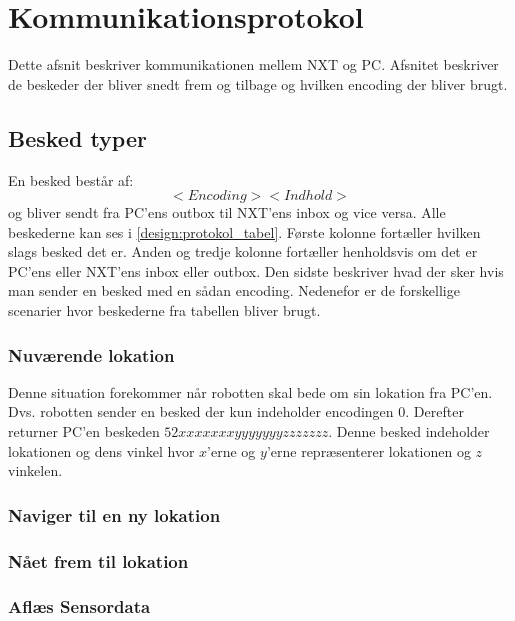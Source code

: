 \section{Kommunikationsprotokol}
Dette afsnit beskriver kommunikationen mellem NXT og PC.
Afsnitet beskriver de beskeder der bliver snedt frem og tilbage og hvilken encoding der bliver brugt.

\subsection{Besked typer}
En besked består af:
\begin{equation}
<Encoding><Indhold>
\end{equation}
og bliver sendt fra PC'ens outbox til NXT'ens inbox og vice versa.
Alle beskederne kan ses i \cref{design:protokol_tabel}.
Første kolonne fortæller hvilken slags besked det er.
Anden og tredje kolonne fortæller henholdsvis om det er PC'ens eller NXT'ens inbox eller outbox.
Den sidste beskriver hvad der sker hvis man sender en besked med en sådan encoding.
Nedenefor er de forskellige scenarier hvor beskederne fra tabellen bliver brugt.
\subsubsection{Nuværende lokation}
Denne situation forekommer når robotten skal bede om sin lokation fra PC'en.
Dvs. robotten sender en besked der kun indeholder encodingen $0$.
Derefter returner PC'en beskeden $52xxxxxxxyyyyyyyzzzzzzz$.
Denne besked indeholder lokationen og dens vinkel hvor $x$'erne og $y$'erne repræsenterer lokationen og $z$ vinkelen.
\subsubsection{Naviger til en ny lokation}
\subsubsection{Nået frem til lokation}
\subsubsection{Aflæs Sensordata}

